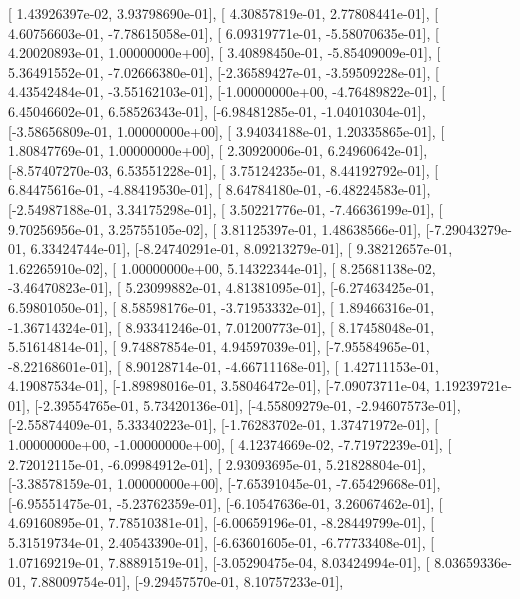 \documentclass{article}
\begin{document}
       [ 1.43926397e-02,  3.93798690e-01],
       [ 4.30857819e-01,  2.77808441e-01],
       [ 4.60756603e-01, -7.78615058e-01],
       [ 6.09319771e-01, -5.58070635e-01],
       [ 4.20020893e-01,  1.00000000e+00],
       [ 3.40898450e-01, -5.85409009e-01],
       [ 5.36491552e-01, -7.02666380e-01],
       [-2.36589427e-01, -3.59509228e-01],
       [ 4.43542484e-01, -3.55162103e-01],
       [-1.00000000e+00, -4.76489822e-01],
       [ 6.45046602e-01,  6.58526343e-01],
       [-6.98481285e-01, -1.04010304e-01],
       [-3.58656809e-01,  1.00000000e+00],
       [ 3.94034188e-01,  1.20335865e-01],
       [ 1.80847769e-01,  1.00000000e+00],
       [ 2.30920006e-01,  6.24960642e-01],
       [-8.57407270e-03,  6.53551228e-01],
       [ 3.75124235e-01,  8.44192792e-01],
       [ 6.84475616e-01, -4.88419530e-01],
       [ 8.64784180e-01, -6.48224583e-01],
       [-2.54987188e-01,  3.34175298e-01],
       [ 3.50221776e-01, -7.46636199e-01],
       [ 9.70256956e-01,  3.25755105e-02],
       [ 3.81125397e-01,  1.48638566e-01],
       [-7.29043279e-01,  6.33424744e-01],
       [-8.24740291e-01,  8.09213279e-01],
       [ 9.38212657e-01,  1.62265910e-02],
       [ 1.00000000e+00,  5.14322344e-01],
       [ 8.25681138e-02, -3.46470823e-01],
       [ 5.23099882e-01,  4.81381095e-01],
       [-6.27463425e-01,  6.59801050e-01],
       [ 8.58598176e-01, -3.71953332e-01],
       [ 1.89466316e-01, -1.36714324e-01],
       [ 8.93341246e-01,  7.01200773e-01],
       [ 8.17458048e-01,  5.51614814e-01],
       [ 9.74887854e-01,  4.94597039e-01],
       [-7.95584965e-01, -8.22168601e-01],
       [ 8.90128714e-01, -4.66711168e-01],
       [ 1.42711153e-01,  4.19087534e-01],
       [-1.89898016e-01,  3.58046472e-01],
       [-7.09073711e-04,  1.19239721e-01],
       [-2.39554765e-01,  5.73420136e-01],
       [-4.55809279e-01, -2.94607573e-01],
       [-2.55874409e-01,  5.33340223e-01],
       [-1.76283702e-01,  1.37471972e-01],
       [ 1.00000000e+00, -1.00000000e+00],
       [ 4.12374669e-02, -7.71972239e-01],
       [ 2.72012115e-01, -6.09984912e-01],
       [ 2.93093695e-01,  5.21828804e-01],
       [-3.38578159e-01,  1.00000000e+00],
       [-7.65391045e-01, -7.65429668e-01],
       [-6.95551475e-01, -5.23762359e-01],
       [-6.10547636e-01,  3.26067462e-01],
       [ 4.69160895e-01,  7.78510381e-01],
       [-6.00659196e-01, -8.28449799e-01],
       [ 5.31519734e-01,  2.40543390e-01],
       [-6.63601605e-01, -6.77733408e-01],
       [ 1.07169219e-01,  7.88891519e-01],
       [-3.05290475e-04,  8.03424994e-01],
       [ 8.03659336e-01,  7.88009754e-01],
       [-9.29457570e-01,  8.10757233e-01],
\end{document}
